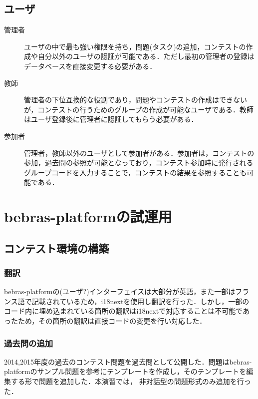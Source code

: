 \documentclass[a4paper]{jarticle}
\begin{document}
\begin{multicols}{2}
\subsection{ユーザ}
\begin{description}
\item[管理者]  ユーザの中で最も強い権限を持ち，問題(タスク)の追加，コンテストの作成や自分以外のユーザの認証が可能である．ただし最初の管理者の登録はデータベースを直接変更する必要がある． 
\end{description}

\begin{description}
\item[教師] 管理者の下位互換的な役割であり，問題やコンテストの作成はできないが，コンテストの行うためのグループの作成が可能なユーザである．教師はユーザ登録後に管理者に認証してもらう必要がある．
\end{description}

\begin{description}
\item[参加者] 管理者，教師以外のユーザとして参加者がある．参加者は，コンテストの参加，過去問の参照が可能となっており，コンテスト参加時に発行されるグループコードを入力することで，コンテストの結果を参照することも可能である．
\end{description}




\section{bebras-platformの試運用}
\subsection{コンテスト環境の構築}
\subsubsection{翻訳}
bebras-platformの(ユーザ?)インターフェイスは大部分が英語，また一部はフランス語で記載されているため，i18nextを使用し翻訳を行った．しかし，一部のコード内に埋め込まれている箇所の翻訳はi18nextで対応することは不可能であったため，その箇所の翻訳は直接コードの変更を行い対応した．
\subsubsection{過去問の追加}
2014,2015年度の過去のコンテスト問題を過去問として公開した．問題はbebras-platformのサンプル問題を参考にテンプレートを作成し，そのテンプレートを編集する形で問題を追加した．本演習では，
非対話型の問題形式のみ追加を行った．


\end{multicols}
\end{document}
